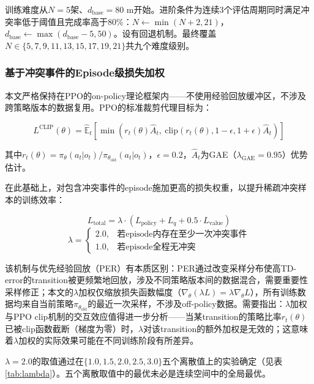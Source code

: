 \documentclass[12pt,a4paper,UTF8]{ctexart}
\begin{document}
训练难度从$N=5$架、$d_{\text{base}}=80$ m开始。进阶条件为连续3个评估周期同时满足冲突率低于阈值且完成率高于80\%：$N \leftarrow \min(N+2, 21)$，$d_{\text{base}} \leftarrow \max(d_{\text{base}}-5, 50)$。设有回退机制。最终覆盖$N \in \{5, 7, 9, 11, 13, 15, 17, 19, 21\}$共九个难度级别。

\subsubsection{基于冲突事件的Episode级损失加权}

本文严格保持在PPO的on-policy理论框架内——不使用经验回放缓冲区，不涉及跨策略版本的数据复用。PPO的标准裁剪代理目标为：

\begin{equation}
    L^{\text{CLIP}}(\theta) = \hat{\mathbb{E}}_t\left[\min\left(r_t(\theta)\hat{A}_t,\ \text{clip}(r_t(\theta), 1-\epsilon, 1+\epsilon)\hat{A}_t\right)\right]
\end{equation}

其中$r_t(\theta) = \pi_\theta(a_t|o_t) / \pi_{\theta_{\text{old}}}(a_t|o_t)$，$\epsilon = 0.2$，$\hat{A}_t$为GAE（$\lambda_{\text{GAE}}=0.95$）优势估计。

在此基础上，对包含冲突事件的episode施加更高的损失权重，以提升稀疏冲突样本的训练效率：

\begin{equation}
    L_{\text{total}} = \lambda \cdot (L_{\text{policy}} + L_q + 0.5 \cdot L_{\text{value}})
\end{equation}
\begin{equation}
    \lambda = \begin{cases}
        2.0, & \text{若episode内存在至少一次冲突事件} \\
        1.0, & \text{若episode全程无冲突}
    \end{cases}
\end{equation}

该机制与优先经验回放（PER）有本质区别：PER通过改变采样分布使高TD-error的transition被更频繁地回放，涉及不同策略版本间的数据混合，需要重要性采样修正；本文的$\lambda$加权仅缩放损失函数幅度（$\nabla_\theta(\lambda L) = \lambda \nabla_\theta L$），所有训练数据均来自当前策略$\pi_{\theta_{\text{old}}}$的最近一次采样，不涉及off-policy数据。需要指出：$\lambda$加权与PPO clip机制的交互效应值得进一步分析——当某transition的策略比率$r_t(\theta)$已被clip函数截断（梯度为零）时，$\lambda$对该transition的额外加权是无效的；这意味着$\lambda$加权的实际效果可能在不同训练阶段有所差异。

$\lambda=2.0$的取值通过在$\{1.0, 1.5, 2.0, 2.5, 3.0\}$五个离散值上的实验确定（见表\ref{tab:lambda}）。五个离散取值中的最优未必是连续空间中的全局最优。
\end{document}
